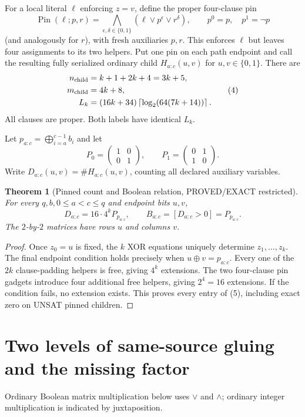 \documentclass[11pt]{article}
\newtheorem{theorem}{Theorem}
\begin{document}
For a local literal $\ell$ enforcing $z=v$, define the proper
four-clause pin
\[
 \operatorname{Pin}(\ell;p,r)=
 \bigwedge_{\epsilon,\delta\in\{0,1\}}
 (\ell\vee p^{\epsilon}\vee r^{\delta}),\qquad
 p^0=p,\quad p^1=\neg p
                                                        \tag{3}
\]
(and analogously for $r$), with fresh auxiliaries $p,r$.
This enforces $\ell$ but leaves four assignments to its two helpers.
Put one pin on each path endpoint and call the resulting fully
serialized ordinary child $H_{a:c}(u,v)$ for $u,v\in\{0,1\}$.
There are
\[
 \begin{split}
 n_{\rm child}&=k+1+2k+4=3k+5,\\
 m_{\rm child}&=4k+8,\\
 L_k&=(16k+34)\left\lceil\log_2(64(7k+14))\right\rceil .
 \end{split}                                           \tag{4}
\]
All clauses are proper. Both labels have identical $L_k$.

Let $p_{a:c}=\bigoplus_{i=a}^{c-1}b_i$ and let
\[
 P_0=\begin{pmatrix}1&0\\0&1\end{pmatrix},\qquad
 P_1=\begin{pmatrix}0&1\\1&0\end{pmatrix}.
\]
Write $D_{a:c}(u,v)=\#H_{a:c}(u,v)$, counting all declared
auxiliary variables.

\begin{theorem}[Pinned count and Boolean relation, PROVED/EXACT restricted]
For every $q,b,0\le a<c\le q$ and endpoint bits $u,v$,
\[
 \boxed{D_{a:c}=16\cdot4^k P_{p_{a:c}},\qquad
 B_{a:c}=[D_{a:c}>0]=P_{p_{a:c}}.}                     \tag{5}
\]
The $2$-by-$2$ matrices have rows $u$ and columns $v$.
\end{theorem}
\begin{proof}
Once $z_0=u$ is fixed, the $k$ XOR equations uniquely determine
$z_1,\ldots,z_k$. The final endpoint condition holds precisely when
$u\oplus v=p_{a:c}$. Every one of the $2k$ clause-padding helpers
is free, giving $4^k$ extensions. The two four-clause pin gadgets
introduce four additional free helpers, giving $2^4=16$ extensions.
If the condition fails, no extension exists. This proves every entry
of (5), including exact zero on UNSAT pinned children.
\end{proof}

\section{Two levels of same-source gluing and the missing factor}
Ordinary Boolean matrix multiplication below uses $\vee$ and
$\wedge$; ordinary integer multiplication is indicated by juxtaposition.
\end{document}
